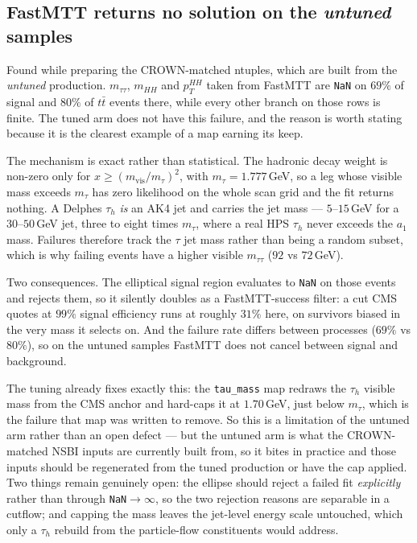 \documentclass[11pt,a4paper]{article}
\newcommand{\tauh}{\tau_{h}}
\newcommand{\mtautau}{m_{\tau\tau}}
\newcommand{\mvis}{m_{\mathrm{vis}}}
\newcommand{\mtau}{m_{\tau}}
\begin{document}
\subsection{FastMTT returns no solution on the \emph{untuned} samples}
\label{sec:fastmtt}

Found while preparing the CROWN-matched ntuples, which are built from the \emph{untuned}
production. $\mtautau$, $m_{HH}$ and $p_{T}^{HH}$ taken from FastMTT are \texttt{NaN} on
$69\%$ of signal and $80\%$ of $t\bar t$ events there, while every other branch on those rows
is finite. The tuned arm does not have this failure, and the reason is worth stating
because it is the clearest example of a map earning its keep.

The mechanism is exact rather than statistical. The hadronic decay weight is non-zero only
for $x\ge(\mvis/\mtau)^{2}$, with $\mtau=1.777\,$GeV, so a leg whose visible mass exceeds
$\mtau$ has zero likelihood on the whole scan grid and the fit returns nothing. A Delphes
$\tauh$ \emph{is} an AK4 jet and carries the jet mass --- $5$--$15\,$GeV for a
$30$--$50\,$GeV jet, three to eight times $\mtau$, where a real HPS $\tauh$ never exceeds
the $a_{1}$ mass. Failures therefore track the $\tau$ jet mass rather than being a random
subset, which is why failing events have a higher visible $\mtautau$ ($92$ vs $72\,$GeV).

Two consequences. The elliptical signal region evaluates to \texttt{NaN} on those events and
rejects them, so it silently doubles as a FastMTT-success filter: a cut CMS quotes at $99\%$
signal efficiency runs at roughly $31\%$ here, on survivors biased in the very mass it
selects on. And the failure rate differs between processes ($69\%$ vs $80\%$), so on
the untuned samples FastMTT does not cancel between signal and background.

The tuning already fixes exactly this: the \texttt{tau\_mass} map redraws the $\tauh$
visible mass from the CMS anchor and hard-caps it at $1.70\,$GeV, just below $\mtau$, which
is the failure that map was written to remove. So this is a limitation of the untuned arm
rather than an open defect --- but the untuned arm is what the CROWN-matched NSBI inputs are
currently built from, so it bites in practice and those inputs should be regenerated from the
tuned production or have the cap applied. Two things remain genuinely open: the ellipse
should reject a failed fit \emph{explicitly} rather than through \texttt{NaN}$\rightarrow\infty$,
so the two rejection reasons are separable in a cutflow; and capping the mass leaves the
jet-level energy scale untouched, which only a $\tauh$ rebuild from the particle-flow
constituents would address.
\end{document}
